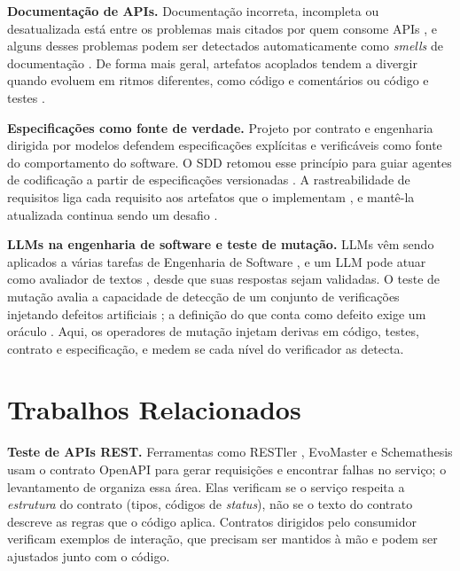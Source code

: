 \documentclass[12pt]{article}
\begin{document}
\textbf{Documentação de APIs.} Documentação incorreta, incompleta ou desatualizada está entre os problemas mais citados por quem consome APIs \cite{uddin2015apidocfails,aghajani2019docissues}, e alguns desses problemas podem ser detectados automaticamente como \textit{smells} de documentação \cite{khan2021docsmells}. De forma mais geral, artefatos acoplados tendem a divergir quando evoluem em ritmos diferentes, como código e comentários \cite{tan2007icomment,wen2019codecomment} ou código e testes \cite{zaidman2011coevolution,lehman1980laws}.

\textbf{Especificações como fonte de verdade.} Projeto por contrato \cite{meyer1992dbc} e engenharia dirigida por modelos \cite{schmidt2006mde} defendem especificações explícitas e verificáveis como fonte do comportamento do software. O SDD retomou esse princípio para guiar agentes de codificação a partir de especificações versionadas \cite{githubspeckit2025}. A rastreabilidade de requisitos liga cada requisito aos artefatos que o implementam \cite{gotel1994traceability,ramesh2001traceability}, e mantê-la atualizada continua sendo um desafio \cite{clelandhuang2014traceability}.

\textbf{LLMs na engenharia de software e teste de mutação.} LLMs vêm sendo aplicados a várias tarefas de Engenharia de Software \cite{hou2024llm4se,fan2023llmse}, e um LLM pode atuar como avaliador de textos \cite{zheng2023judge}, desde que suas respostas sejam validadas. O teste de mutação avalia a capacidade de detecção de um conjunto de verificações injetando defeitos artificiais \cite{demillo1978hints,jia2011mutation,papadakis2019mutation}; a definição do que conta como defeito exige um oráculo \cite{barr2015oracle}. Aqui, os operadores de mutação injetam derivas em código, testes, contrato e especificação, e medem se cada nível do verificador as detecta.

\section{Trabalhos Relacionados}
\label{sec3:trab_rel}

\textbf{Teste de APIs REST.} Ferramentas como RESTler \cite{atlidakis2019restler}, EvoMaster \cite{arcuri2019evomaster} e Schemathesis \cite{hatfield2022schemathesis} usam o contrato OpenAPI para gerar requisições e encontrar falhas no serviço; o levantamento de \cite{golmohammadi2023resttesting} organiza essa área. Elas verificam se o serviço respeita a \textit{estrutura} do contrato (tipos, códigos de \textit{status}), não se o texto do contrato descreve as regras que o código aplica. Contratos dirigidos pelo consumidor \cite{robinson2006cdc} verificam exemplos de interação, que precisam ser mantidos à mão e podem ser ajustados junto com o código.
\end{document}
